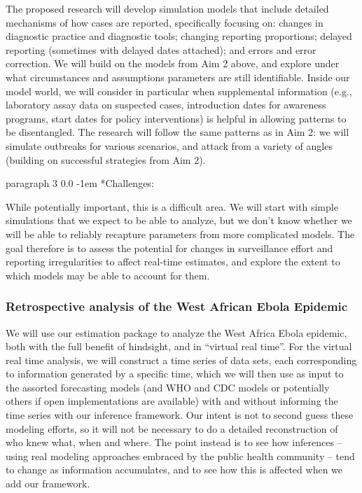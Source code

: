 \documentclass[12pt]{article}
\makeatletter
\renewcommand{\paragraph}{\vspace{0.40ex \@plus 0.2ex \@minus 0.0ex}\@startsection%
{paragraph}%
{3}%
{\parindent}%
{0.0\baselineskip}%
{-1em}%
{\normalfont\normalsize\bfseries}}%
\makeatother
\begin{document}
The proposed research will develop simulation models that include detailed mechanisms of how cases are reported, specifically focusing on: changes in diagnostic practice and diagnostic tools; changing reporting proportions; delayed reporting (sometimes with delayed dates attached); and errors and error correction. We will build on the models from Aim 2 above, and explore under what circumstances and assumptions parameters are still identifiable. Inside our model world, we will consider in particular when supplemental information (e.g., laboratory assay data on suspected cases, introduction dates for awareness programs, start dates for policy interventions) is helpful in allowing patterns to be disentangled.
The research will follow the same patterns as in Aim 2: we will simulate outbreaks for various scenarios, and attack from a variety of angles (building on successful strategies from Aim 2).

\paragraph*{Challenges:}

While potentially important, this is a difficult area. We will start with simple simulations that we expect to be able to analyze, but we don’t know whether we will be able to reliably recapture parameters from more complicated models. The goal therefore is to assess the potential for changes in surveillance effort and reporting irregularities to affect real-time estimates, and explore the extent to which models may be able to account for them.

\subsubsection{Retrospective analysis of the West African Ebola Epidemic}

We will use our estimation package to analyze the West Africa Ebola epidemic, both with the full benefit of hindsight, and in ``virtual real time''. For the virtual real time analysis, we will construct a time series of data sets, each corresponding to information generated by a specific time, which we will then use as input to the assorted forecasting models (and WHO and CDC models or potentially others if open implementations are available) with and without informing the time series with our inference framework. Our intent is not to second guess these modeling efforts, so it will not be necessary to do a detailed reconstruction of who knew what, when and where. The point instead is to see how inferences -- using real modeling approaches embraced by the public health community -- tend to change as information accumulates, and to see how this is affected when we add our framework.
\end{document}
